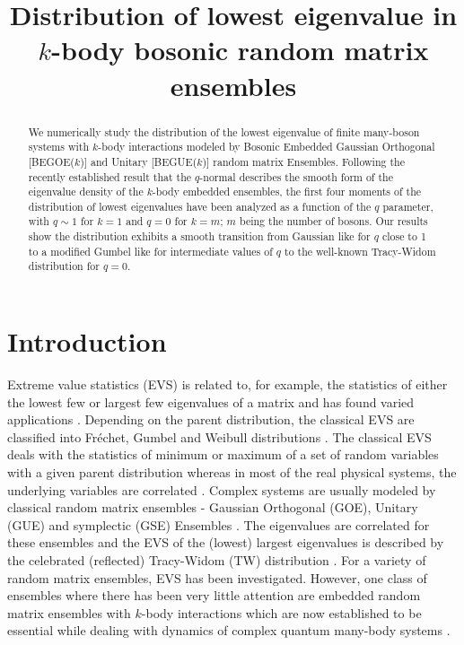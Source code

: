 
\title{Distribution of lowest eigenvalue in $k$-body bosonic random matrix ensembles}
\begin{abstract}

We numerically study the distribution of the lowest eigenvalue of finite many-boson systems with $k$-body interactions modeled by Bosonic Embedded Gaussian Orthogonal [BEGOE($k$)] and Unitary [BEGUE($k$)] random matrix Ensembles.  Following the recently established result that the $q$-normal  describes the smooth form of the eigenvalue density of the $k$-body embedded ensembles, the first four moments of the distribution of lowest eigenvalues have been analyzed as a function of the $q$ parameter, with $q \sim 1$ for $k = 1$ and $q = 0$ for $k = m$; $m$ being the number of bosons.  Our results show the distribution exhibits a smooth transition from Gaussian like  for $q$ close to 1 to a modified Gumbel like for intermediate values of $q$ to the well-known Tracy-Widom distribution for $q=0$.   

\end{abstract}
\maketitle

\section{Introduction} \label{intro}

Extreme value statistics (EVS) is related to, for example,  the statistics of either the lowest few or largest few eigenvalues of a matrix and has found varied applications \cite{Bo-97, De-08, Fo-15}.  Depending on the parent distribution, the classical EVS are classified into Fréchet, Gumbel and Weibull distributions \cite{Gumbel-1958, Galambos-1987}.  The classical EVS deals with the statistics of minimum or maximum of a set of random variables with a given parent distribution whereas in most of the real physical systems, the underlying variables are correlated \cite{Ma-20}.  Complex systems are usually modeled by classical random matrix ensembles - Gaussian Orthogonal (GOE), Unitary (GUE) and symplectic (GSE) Ensembles \cite{Mehta, RMT-book}.  The eigenvalues are correlated for these ensembles and the EVS of the (lowest) largest eigenvalues is described by the celebrated (reflected) Tracy-Widom (TW) distribution \cite{TW-1, TW-2, TW-3}.  For a variety of random matrix ensembles, EVS has been investigated. However, one class of ensembles where there has been very little attention are embedded random matrix ensembles with $k$-body interactions which are now established to be essential while dealing with dynamics of complex quantum many-body systems \cite{MF,  Br-81, BW, vkbk,Ma-2017}.  


